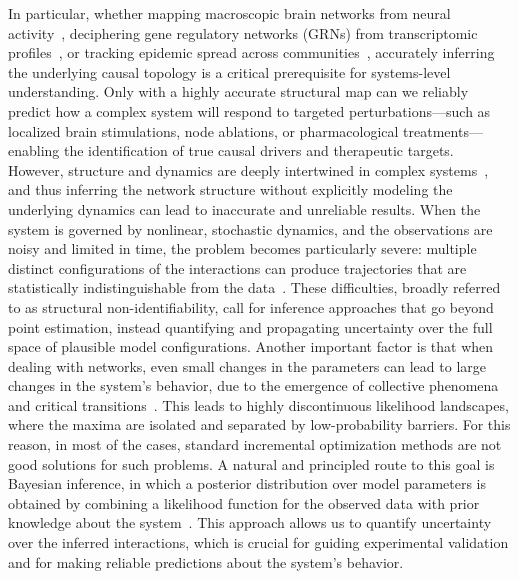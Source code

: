 \documentclass[10pt, aps, rmp,  twocolumn, superscriptaddress, floatfix, showkeys]{revtex4-2}
\begin{document}
In particular, whether mapping macroscopic brain networks from neural activity~\cite{bullmore2009complex}, deciphering gene regulatory networks (GRNs) from transcriptomic profiles~\cite{karlebach2008modelling}, or tracking epidemic spread across communities~\cite{pastor2015epidemic}, accurately inferring the underlying causal topology is a critical prerequisite for systems-level understanding. Only with a highly accurate structural map can we reliably predict how a complex system will respond to targeted perturbations—such as localized brain stimulations, node ablations, or pharmacological treatments—enabling the identification of true causal drivers and therapeutic targets.
However, structure and dynamics are deeply intertwined in complex systems~\cite{gross2008adaptive,barzel2013universality,ghavasieh2024diversity,strogatz2024nonlinear,barzon2024unraveling,sole2001complexity,de2026decoding}, and thus inferring the network structure without explicitly modeling the underlying dynamics can lead to inaccurate and unreliable results. %
When the system is governed by nonlinear, stochastic dynamics, and the observations are noisy and limited in time, the problem becomes particularly severe: multiple distinct configurations of the interactions can produce trajectories that are statistically indistinguishable from the data~\cite{villaverde2014reverse}. These difficulties, broadly referred to as structural non-identifiability, call for inference approaches that go beyond point estimation, instead quantifying and propagating uncertainty over the full space of plausible model configurations.
Another important factor is that when dealing with networks, even small changes in the parameters can lead to large changes in the system's behavior, due to the emergence of collective phenomena and critical transitions~\cite{boccaletti2006complex,dorogovtsev2008critical,pastor2015epidemic, strogatz2024nonlinear}. This leads to highly discontinuous likelihood landscapes, where the maxima are isolated and separated by low-probability barriers. For this reason, in most of the cases, standard incremental optimization methods are not good solutions for such problems.
A natural and principled route to this goal is Bayesian inference, in which a posterior distribution over model parameters is obtained by combining a likelihood function for the observed data with prior knowledge about the system~\cite{peixoto2019network, newman2018network,raimondo2021measuring,peel2022statistical,peixoto2025network}. This approach allows us to quantify uncertainty over the inferred interactions, which is crucial for guiding experimental validation and for making reliable predictions about the system's behavior.
\end{document}
